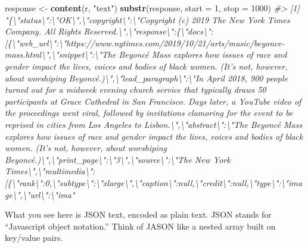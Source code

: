 \documentclass[]{book}
\newenvironment{Shaded}{\begin{snugshade}}{\end{snugshade}}
\newcommand{\CommentTok}[1]{\textcolor[rgb]{0.56,0.35,0.01}{\textit{#1}}}
\newcommand{\DataTypeTok}[1]{\textcolor[rgb]{0.13,0.29,0.53}{#1}}
\newcommand{\DecValTok}[1]{\textcolor[rgb]{0.00,0.00,0.81}{#1}}
\newcommand{\KeywordTok}[1]{\textcolor[rgb]{0.13,0.29,0.53}{\textbf{#1}}}
\newcommand{\NormalTok}[1]{#1}
\newcommand{\StringTok}[1]{\textcolor[rgb]{0.31,0.60,0.02}{#1}}
\begin{document}
\begin{Shaded}
\begin{Highlighting}[]
\NormalTok{response <-}\StringTok{ }\KeywordTok{content}\NormalTok{(r, }\StringTok{"text"}\NormalTok{)}
\KeywordTok{substr}\NormalTok{(response, }\DataTypeTok{start =} \DecValTok{1}\NormalTok{, }\DataTypeTok{stop =} \DecValTok{1000}\NormalTok{)}
\CommentTok{#> [1] "\{\textbackslash{}"status\textbackslash{}":\textbackslash{}"OK\textbackslash{}",\textbackslash{}"copyright\textbackslash{}":\textbackslash{}"Copyright (c) 2019 The New York Times Company. All Rights Reserved.\textbackslash{}",\textbackslash{}"response\textbackslash{}":\{\textbackslash{}"docs\textbackslash{}":[\{\textbackslash{}"web_url\textbackslash{}":\textbackslash{}"https://www.nytimes.com/2019/10/21/arts/music/beyonce-mass.html\textbackslash{}",\textbackslash{}"snippet\textbackslash{}":\textbackslash{}"The Beyoncé Mass explores how issues of race and gender impact the lives, voices and bodies of black women. (It’s not, however, about worshiping Beyoncé.)\textbackslash{}",\textbackslash{}"lead_paragraph\textbackslash{}":\textbackslash{}"In April 2018, 900 people turned out for a midweek evening church service that typically draws 50 participants at Grace Cathedral in San Francisco. Days later, a YouTube video of the proceedings went viral, followed by invitations clamoring for the event to be reprised in cities from Los Angeles to Lisbon.\textbackslash{}",\textbackslash{}"abstract\textbackslash{}":\textbackslash{}"The Beyoncé Mass explores how issues of race and gender impact the lives, voices and bodies of black women. (It’s not, however, about worshiping Beyoncé.)\textbackslash{}",\textbackslash{}"print_page\textbackslash{}":\textbackslash{}"3\textbackslash{}",\textbackslash{}"source\textbackslash{}":\textbackslash{}"The New York Times\textbackslash{}",\textbackslash{}"multimedia\textbackslash{}":[\{\textbackslash{}"rank\textbackslash{}":0,\textbackslash{}"subtype\textbackslash{}":\textbackslash{}"xlarge\textbackslash{}",\textbackslash{}"caption\textbackslash{}":null,\textbackslash{}"credit\textbackslash{}":null,\textbackslash{}"type\textbackslash{}":\textbackslash{}"image\textbackslash{}",\textbackslash{}"url\textbackslash{}":\textbackslash{}"ima"}
\end{Highlighting}
\end{Shaded}

What you see here is JSON text, encoded as plain text. JSON stands for ``Javascript object notation.'' Think of JASON like a nested array built on key/value pairs.
\end{document}
